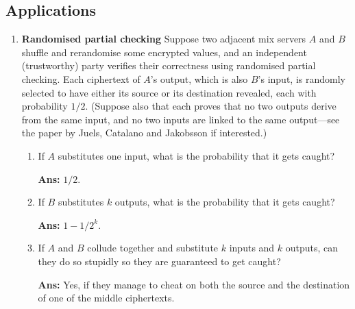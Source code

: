 \documentclass[11pt]{article} %
\begin{document}
\subsection{Applications}
\begin{enumerate}
\item {\bf Randomised partial checking}  Suppose two adjacent mix servers $A$ and $B$ shuffle and rerandomise some encrypted values, and an independent (trustworthy) party verifies their correctness using randomised partial checking.  Each ciphertext of $A$'s output, which is also $B$'s input, is randomly selected to have either its source or its destination revealed, each with probability $1/2$.  (Suppose also that each proves that no two outputs derive from the same input, and no two inputs are linked to the same output---see the paper by Juels, Catalano and Jakobsson if interested.)  
	\begin{enumerate}
	\item If $A$ substitutes one input, what is the probability that it gets caught?

	{\bf Ans: } $1/2$.
	\item If $B$ substitutes $k$ outputs, what is the probability that it gets caught?
	
	{\bf Ans: } $1 - 1/2^k$.
	\item If $A$ and $B$ collude together and substitute $k$ inputs and $k$ outputs, can they do so stupidly so they are guaranteed to get caught?  
	
	{\bf Ans: } Yes, if they manage to cheat on both the source and the destination of one of the middle ciphertexts.
	\end{enumerate}
\end{enumerate}
\end{document}

